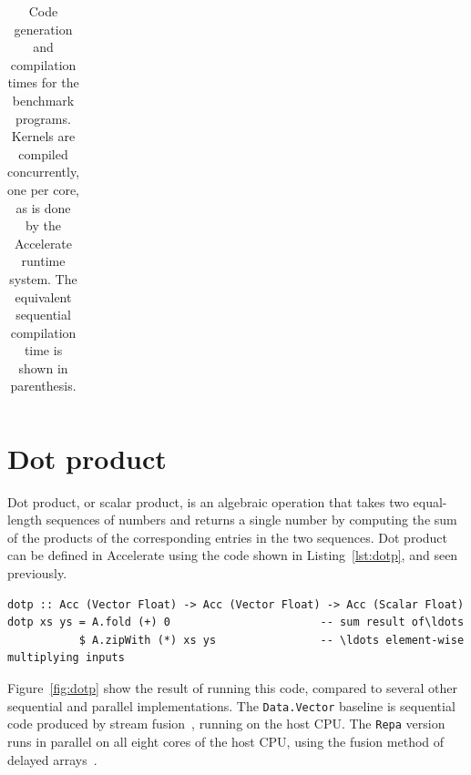 \begin{table}
\begin{tabu}{lrrrr}
\bottomrule

    \end{tabu}
    \caption[Benchmark code generation and compilation times]{Code generation
        and compilation times for the benchmark programs. Kernels are compiled
        concurrently, one per core, as is done by the Accelerate runtime system.
        The equivalent sequential compilation time is shown in parenthesis.}
    \label{tab:compilation_times}
\end{table}



\section{Dot product}
\label{sec:dotp}

Dot product, or scalar product, is an algebraic operation that takes two
equal-length sequences of numbers and returns a single number by computing the
sum of the products of the corresponding entries in the two sequences. Dot
product can be defined in Accelerate using the code shown in
Listing~\ref{lst:dotp}, and seen previously.

\begin{lstlisting}[style=haskell_float
    ,label=lst:dotp
    ,caption={Vector dot-product}]
dotp :: Acc (Vector Float) -> Acc (Vector Float) -> Acc (Scalar Float)
dotp xs ys = A.fold (+) 0                       -- sum result of\ldots
           $ A.zipWith (*) xs ys                -- \ldots element-wise multiplying inputs
\end{lstlisting}

Figure~\ref{fig:dotp} show the result of running this code, compared to several
other sequential and parallel implementations. The \texttt{Data.Vector} baseline
is sequential code produced by stream fusion~\cite{Coutts:2007kp}, running on
the host CPU. The \texttt{Repa} version runs in parallel on all eight cores of
the host CPU, using the fusion method of delayed arrays~\cite{Keller:2010er}.

